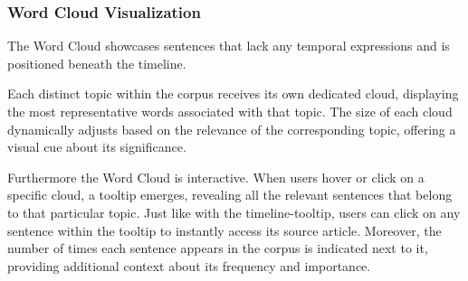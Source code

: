 \documentclass[a4paper,10pt]{report}
\begin{document}
\subsubsection{Word Cloud Visualization}
The Word Cloud showcases sentences that lack any temporal expressions and is positioned beneath the timeline.

Each distinct topic within the corpus receives its own dedicated cloud, displaying the most representative words associated with that topic. The size of each cloud dynamically adjusts based on the relevance of the corresponding topic, offering a visual cue about its significance.

Furthermore the Word Cloud is interactive. When users hover or click on a specific cloud, a tooltip emerges, revealing all the relevant sentences that belong to that particular topic. Just like with the timeline-tooltip, users can click on any sentence within the tooltip to instantly access its source article. Moreover, the number of times each sentence appears in the corpus is indicated next to it, providing additional context about its frequency and importance.






\end{document}
